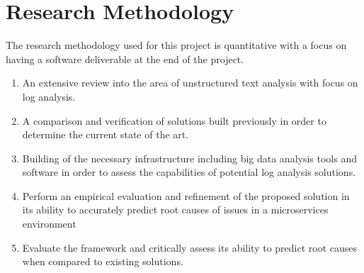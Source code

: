 \chapter{Research Methodology}
The research methodology used for this project is quantitative with a focus on having a software deliverable at the end of the project.

\begin{enumerate}
	\item An extensive review into the area of unstructured text analysis with focus on log analysis.
	\item A comparison and verification of solutions built previously in order to determine the current state of the art.
	\item Building of the necessary infrastructure including big data analysis tools and software in order to assess the capabilities of potential log analysis solutions.
	\item Perform an empirical evaluation and refinement of the proposed solution in its ability to accurately predict root causes of issues in a microservices environment
	\item Evaluate the framework and critically assess its ability to predict root causes when compared to existing solutions.
\end{enumerate}